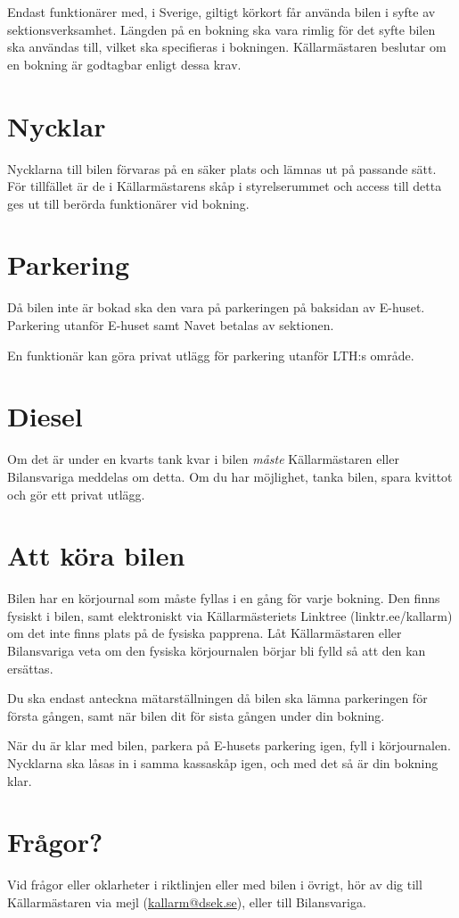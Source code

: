 \documentclass{dsekprotokoll}
\begin{document}
Endast funktionärer med, i Sverige, giltigt körkort får använda bilen i syfte av sektionsverksamhet. Längden på en bokning ska vara rimlig för det syfte bilen ska användas till, vilket ska specifieras i bokningen. Källarmästaren beslutar om en bokning är godtagbar enligt dessa krav.

\section{Nycklar}
Nycklarna till bilen förvaras på en säker plats och lämnas ut på passande sätt. För tillfället är de i Källarmästarens skåp i styrelserummet och access till detta ges ut till berörda funktionärer vid bokning.

\section{Parkering}

Då bilen inte är bokad ska den vara på parkeringen på baksidan av E-huset. Parkering utanför E-huset samt Navet betalas av sektionen.

En funktionär kan göra privat utlägg för parkering utanför LTH:s område. 


\section{Diesel} 

Om det är under en kvarts tank kvar i bilen \emph{måste} Källarmästaren eller Bilansvariga meddelas om detta. Om du har möjlighet, tanka bilen, spara kvittot och gör ett privat utlägg.

\section{Att köra bilen} 

Bilen har en körjournal som måste fyllas i en gång för varje bokning. Den finns fysiskt i bilen, samt elektroniskt via Källarmästeriets Linktree (linktr.ee/kallarm) om det inte finns plats på de fysiska papprena. Låt Källarmästaren eller Bilansvariga veta om den fysiska körjournalen börjar bli fylld så att den kan ersättas.

Du ska endast anteckna mätarställningen då bilen ska lämna parkeringen för första gången, samt när bilen dit för sista gången under din bokning.

När du är klar med bilen, parkera på E-husets parkering igen, fyll i körjournalen. Nycklarna ska låsas in i samma kassaskåp igen, och med det så är din bokning klar.


\section{Frågor?}
Vid frågor eller oklarheter i riktlinjen eller med bilen i övrigt, hör av dig till Källarmästaren via mejl (\href{mailto:kallarm@dsek.se}{kallarm@dsek.se}), eller till Bilansvariga.
\end{document}
